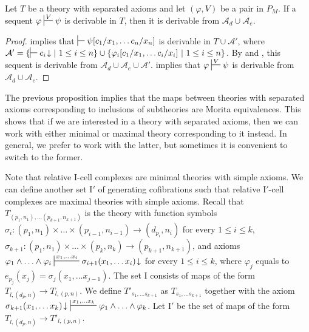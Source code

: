 \documentclass[reqno]{amsart}
\theoremstyle{definition}
\theoremstyle{remark}
\newcommand{\I}{\mathrm{I}}
\numberwithin{figure}{section}
\begin{document}
\begin{prop}
Let $T$ be a theory with separated axioms and let $(\varphi,V)$ be a pair in $P_M$.
If a sequent $\varphi \sststile{}{V} \psi$ is derivable in $T$, then it is derivable from $\mathcal{A}_d \cup \mathcal{A}_e$.
\end{prop}
\begin{proof}
 implies that $\sststile{}{} \psi[c_1/x_1, \ldots c_n/x_n]$ is derivable in $T \cup \mathcal{A}'$, where $\mathcal{A}' = \{ \sststile{}{} c_i\!\downarrow |\ 1 \leq i \leq n \} \cup \{ \varphi_i[c_1/x_1, \ldots c_i/x_i]\ |\ 1 \leq i \leq n \}$.
By  and , this sequent is derivable from $\mathcal{A}_d \cup \mathcal{A}_e \cup \mathcal{A}'$.
 implies that $\varphi \sststile{}{V} \psi$ is derivable from $\mathcal{A}_d \cup \mathcal{A}_e$.
\end{proof}

The previous proposition implies that the maps between theories with separated axioms corresponding to inclusions of subtheories are Morita equivalences.
This shows that if we are interested in a theory with separated axioms, then we can work with either minimal or maximal theory corresponding to it instead.
In general, we prefer to work with the latter, but sometimes it is convenient to switch to the former.

Note that relative $\I$-cell complexes are minimal theories with simple axioms.
We can define another set $\I'$ of generating cofibrations such that relative $\I'$-cell complexes are maximal theories with simple axioms.
Recall that $T_{(p_1,n_1), \ldots (p_{k+1},n_{k+1})}$ is the theory with function symbols $\sigma_i : (p_1,n_1) \times \ldots \times (p_{i-1},n_{i-1}) \to (d_{p_i},n_i)$ for every $1 \leq i \leq k$,
$\sigma_{k+1} : (p_1,n_1) \times \ldots \times (p_k,n_k) \to (p_{k+1},n_{k+1})$, and axioms $\varphi_1 \land \ldots \land \varphi_i \sststile{}{x_1, \ldots x_i} \sigma_{i+1}(x_1, \ldots x_i)\!\downarrow$ for every $1 \leq i \leq k$,
where $\varphi_j$ equals to $e_{p_j}(x_j) = \sigma_j(x_1, \ldots x_{j-1})$.
The set $\I$ consists of maps of the form $T_{l, (d_p,n)} \to T_{l, (p,n)}$.
We define $T'_{s_1, \ldots s_{k+1}}$ as $T_{s_1, \ldots s_{k+1}}$ together with the axiom $\sigma_{k+1}(x_1, \ldots x_k)\!\downarrow\ \sststile{}{x_1, \ldots x_k} \varphi_1 \land \ldots \land \varphi_k$.
Let $\I'$ be the set of maps of the form $T_{l, (d_p,n)} \to T'_{l, (p,n)}$.
\end{document}
